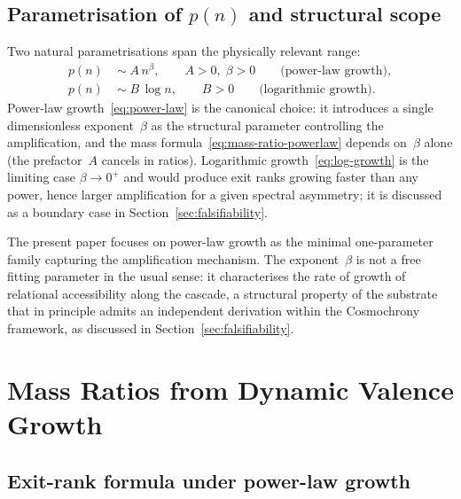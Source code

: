 \documentclass[11pt,a4paper]{article}
\begin{document}
    \subsection{Parametrisation of $p(n)$ and structural scope}
      \label{subsec:parametrisation}

      Two natural parametrisations span the physically relevant range:
      \begin{align}
        \label{eq:power-law}
        p(n) \;&\sim\; A\, n^{\beta},
        \qquad A > 0,\; \beta > 0
        \qquad \text{(power-law growth)},\\[4pt]
        \label{eq:log-growth}
        p(n) \;&\sim\; B\, \log n,
        \qquad B > 0
        \qquad \text{(logarithmic growth)}.
      \end{align}
      Power-law growth~\eqref{eq:power-law} is the canonical choice:
      it introduces a single dimensionless exponent~$\beta$ as the structural
      parameter controlling the amplification, and the mass
      formula~\eqref{eq:mass-ratio-powerlaw} depends on~$\beta$ alone
      (the prefactor~$A$ cancels in ratios).
      Logarithmic growth~\eqref{eq:log-growth} is the limiting case $\beta \to 0^{+}$
      and would produce exit ranks growing faster than any power, hence larger
      amplification for a given spectral asymmetry; it is discussed as a boundary
      case in Section~\ref{sec:falsifiability}.

      The present paper focuses on power-law growth as the minimal
      one-parameter family capturing the amplification mechanism.
      The exponent~$\beta$ is not a free fitting parameter in the usual sense:
      it characterises the rate of growth of relational accessibility along the cascade,
      a structural property of the substrate that in principle admits an independent
      derivation within the Cosmochrony framework, as discussed in
      Section~\ref{sec:falsifiability}.

  \section{Mass Ratios from Dynamic Valence Growth}
    \label{sec:massformula}

    \subsection{Exit-rank formula under power-law growth}
      \label{subsec:exit-formula}
\end{document}
